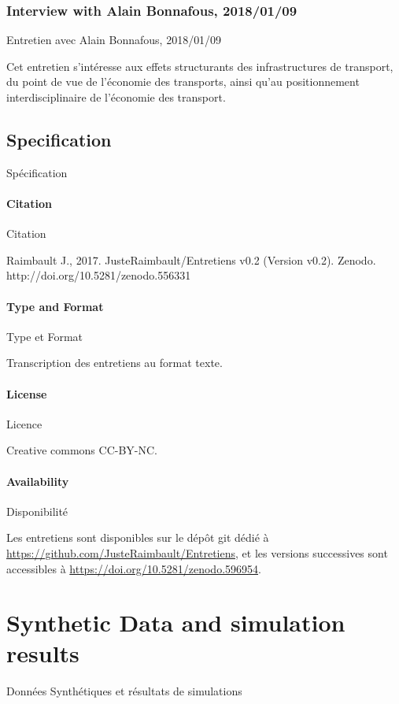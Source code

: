\subsubsection{Interview with Alain Bonnafous, 2018/01/09}{Entretien avec Alain Bonnafous, 2018/01/09}

Cet entretien s'intéresse aux effets structurants des infrastructures de transport, du point de vue de l'économie des transports, ainsi qu'au positionnement interdisciplinaire de l'économie des transport.



\subsection{Specification}{Spécification}

\paragraph{Citation}{Citation}

Raimbault J., 2017. JusteRaimbault/Entretiens v0.2 (Version v0.2). Zenodo. http://doi.org/10.5281/zenodo.556331

\paragraph{Type and Format}{Type et Format}

Transcription des entretiens au format texte.

\paragraph{License}{Licence}

Creative commons CC-BY-NC.

\paragraph{Availability}{Disponibilité}

Les entretiens sont disponibles sur le dépôt git dédié à \url{https://github.com/JusteRaimbault/Entretiens}, et les versions successives sont accessibles à \url{https://doi.org/10.5281/zenodo.596954}.








\section{Synthetic Data and simulation results}{Données Synthétiques et résultats de simulations}

